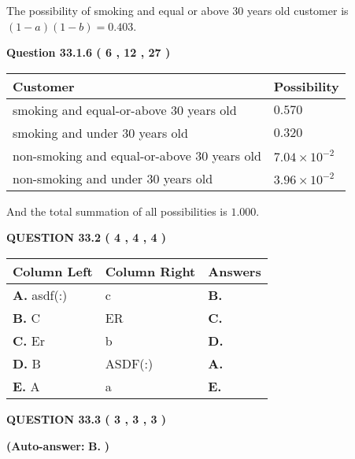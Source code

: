\documentclass[12pt]{article}
\begin{document}
The possibility of  %
smoking and  %
equal or above 30 years old
customer is $ (1-a)(1-b) =  %
0.403 $.
  
  
{\textbf{\large{Question
33.1.6 
 (           6 ,          12 ,          27 )
}}}

 
\noindent
\begin{tabular}{|l|l|}
\hline
Customer & Possibility \\
\hline
smoking  and  %
equal-or-above 30 years old &
  $ %
0.570$ \\
\hline
smoking  and  %
under 30 years old &
  $ %
0.320$ \\
\hline
 non-smoking and  %
equal-or-above 30 years old &
  $ %
7.04 \times 10^{-2}$ \\
\hline
 non-smoking and  %
under 30 years old &
  $ %
3.96 \times 10^{-2}$ \\
\hline
\end{tabular}
 
\noindent
 And the total summation of all possibilities is $  %
1.000 $.
 
  
  
{\textbf{\large{QUESTION
33.2 
 (           4 ,           4 ,           4 )
}}}
 
 
\noindent{}
  
  
\begin{tabular}{|l|l|l|}
 \hline
 Column Left & Column Right  & Answers       \\ 
 \hline
{\textbf{\large{
A.}}}
asdf(:)
  & 
c
 & 
{\textbf{\large{
B.}}}
 \\ 
 \hline
{\textbf{\large{
B.}}}
C
  & 
ER
 & 
{\textbf{\large{
C.}}}
 \\ 
 \hline
{\textbf{\large{
C.}}}
Er
  & 
b
 & 
{\textbf{\large{
D.}}}
 \\ 
 \hline
{\textbf{\large{
D.}}}
B
  & 
ASDF(:)
 & 
{\textbf{\large{
A.}}}
 \\ 
 \hline
{\textbf{\large{
E.}}}
A
  & 
a
 & 
{\textbf{\large{
E.}}}
 \\ 
 \hline
 \end{tabular}
  
  
\noindent{}
 
 
  
  
{\textbf{\large{QUESTION
33.3 
 (           3 ,           3 ,           3 )
}}}
 
 
{\textbf{(Auto-answer:}}
{\textbf{\large{
B.}}}
{\textbf{)}}
 
\end{document}
